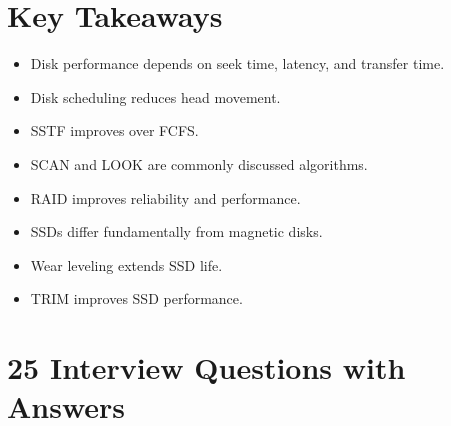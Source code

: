 \section{Key Takeaways}

\begin{itemize}
\item Disk performance depends on seek time, latency, and transfer time.
\item Disk scheduling reduces head movement.
\item SSTF improves over FCFS.
\item SCAN and LOOK are commonly discussed algorithms.
\item RAID improves reliability and performance.
\item SSDs differ fundamentally from magnetic disks.
\item Wear leveling extends SSD life.
\item TRIM improves SSD performance.
\end{itemize}

\section{25 Interview Questions with Answers}

